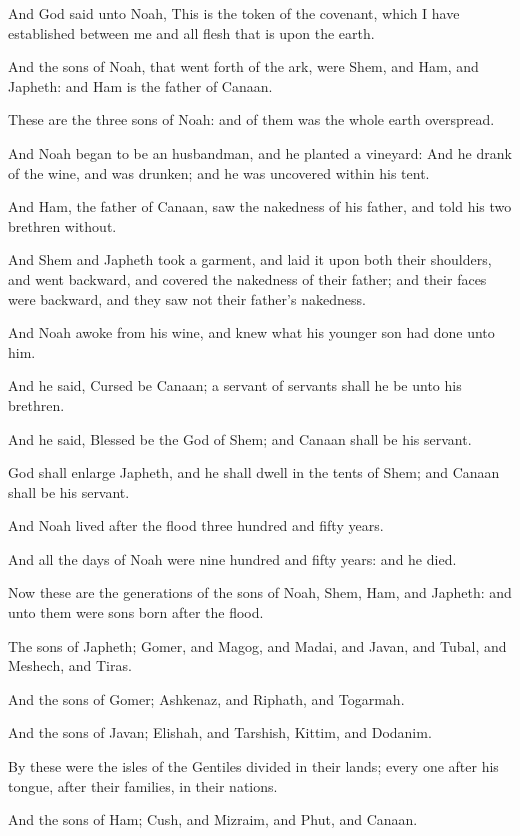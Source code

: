 \Verse And God said unto Noah, This is the token of the covenant, which I have established between me and all flesh that is upon the earth.

\Verse And the sons of Noah, that went forth of the ark, were Shem, and Ham, and Japheth: and Ham is the father of Canaan.

\Verse These are the three sons of Noah: and of them was the whole earth overspread.

\Verse And Noah began to be an husbandman, and he planted a vineyard: \Verse And he drank of the wine, and was drunken; and he was uncovered within his tent.

\Verse And Ham, the father of Canaan, saw the nakedness of his father, and told his two brethren without.

\Verse And Shem and Japheth took a garment, and laid it upon both their shoulders, and went backward, and covered the nakedness of their father; and their faces were backward, and they saw not their father's nakedness.

\Verse And Noah awoke from his wine, and knew what his younger son had done unto him.

\Verse And he said, Cursed be Canaan; a servant of servants shall he be unto his brethren.

\Verse And he said, Blessed be the \LORD God of Shem; and Canaan shall be his servant.

\Verse God shall enlarge Japheth, and he shall dwell in the tents of Shem; and Canaan shall be his servant.

\Verse And Noah lived after the flood three hundred and fifty years.

\Verse And all the days of Noah were nine hundred and fifty years: and he died.

\Chapter
\Verse Now these are the generations of the sons of Noah, Shem, Ham, and Japheth: and unto them were sons born after the flood.

\Verse The sons of Japheth; Gomer, and Magog, and Madai, and Javan, and Tubal, and Meshech, and Tiras.

\Verse And the sons of Gomer; Ashkenaz, and Riphath, and Togarmah.

\Verse And the sons of Javan; Elishah, and Tarshish, Kittim, and Dodanim.

\Verse By these were the isles of the Gentiles divided in their lands; every one after his tongue, after their families, in their nations.

\Verse And the sons of Ham; Cush, and Mizraim, and Phut, and Canaan.

